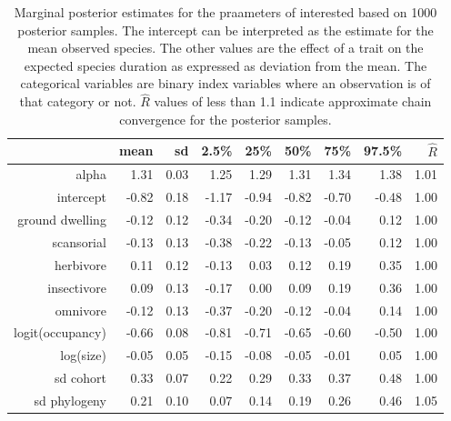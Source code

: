 \begin{table}[ht]
  \centering
  \caption{Marginal posterior estimates for the praameters of interested based on 1000 posterior samples. The intercept can be interpreted as the estimate for the mean observed species. The other values are the effect of a trait on the expected species duration as expressed as deviation from the mean. The categorical variables are binary index variables where an observation is of that category or not. \(\hat{R}\) values of less than 1.1 indicate approximate chain convergence for the posterior samples.}
  \begin{tabular}{rrrrrrrrr}
    \hline
    & mean & sd & 2.5\% & 25\% & 50\% & 75\% & 97.5\% & \(\hat{R}\) \\ 
    \hline
    \hline
    alpha & 1.31 & 0.03 & 1.25 & 1.29 & 1.31 & 1.34 & 1.38 & 1.01 \\ 
    \hline
    intercept & -0.82 & 0.18 & -1.17 & -0.94 & -0.82 & -0.70 & -0.48 & 1.00 \\ 
    ground dwelling & -0.12 & 0.12 & -0.34 & -0.20 & -0.12 & -0.04 & 0.12 & 1.00 \\ 
    scansorial & -0.13 & 0.13 & -0.38 & -0.22 & -0.13 & -0.05 & 0.12 & 1.00 \\ 
    herbivore & 0.11 & 0.12 & -0.13 & 0.03 & 0.12 & 0.19 & 0.35 & 1.00 \\ 
    insectivore & 0.09 & 0.13 & -0.17 & 0.00 & 0.09 & 0.19 & 0.36 & 1.00 \\ 
    omnivore & -0.12 & 0.13 & -0.37 & -0.20 & -0.12 & -0.04 & 0.14 & 1.00 \\ 
    logit(occupancy) & -0.66 & 0.08 & -0.81 & -0.71 & -0.65 & -0.60 & -0.50 & 1.00 \\ 
    log(size) & -0.05 & 0.05 & -0.15 & -0.08 & -0.05 & -0.01 & 0.05 & 1.00 \\ 
    \hline
    sd cohort & 0.33 & 0.07 & 0.22 & 0.29 & 0.33 & 0.37 & 0.48 & 1.00 \\ 
    sd phylogeny & 0.21 & 0.10 & 0.07 & 0.14 & 0.19 & 0.26 & 0.46 & 1.05 \\ 
    \hline
  \end{tabular}
  \label{tab:post_sum}
\end{table}
